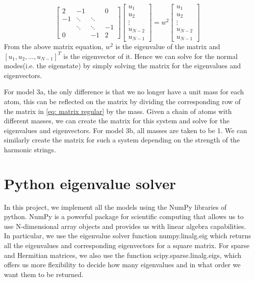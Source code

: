 \begin{equation} \label{eq: matrix regular}
\left[ \begin{matrix}
2 & -1 & & 0\\
-1 & \ddots & \ddots & \\
& \ddots & \ddots & -1 \\
0 & & -1 & 2 \end{matrix} \right]
\begin{bmatrix}
     u_{1}  \\
     u_{2}  \\
    \vdots  \\
    u_{N-2}\\
    u_{N-1}
    \end{bmatrix} = w^2\begin{bmatrix}
    u_{1}  \\
    u_{2}  \\
    \vdots  \\
    u_{N-2}\\
    u_{N-1}
    \end{bmatrix}
\end{equation}
From the above matrix equation, $w^2$ is the eigenvalue of the matrix and $[u_1,u_2,...,u_{N-1}]^T$ is the eigenvector of it. Hence we can solve for the normal modes(i.e. the eigenstate) by simply solving the matrix for the eigenvalues and eigenvectors. 

For model 3a, the only difference is that we no longer have a unit mass for each atom, this can be reflected on the matrix by dividing the corresponding row of the matrix in \ref{eq: matrix regular} by the mass. Given a chain of atoms with different masses, we can create the matrix for this system and solve for the eigenvalues and eigenvectors. 
For model 3b, all masses are taken to be 1. We can similarly create the matrix for such a system depending on the strength of the harmonic strings. 

\section{Python eigenvalue solver}
In this project, we implement all the models using the NumPy libraries of python. NumPy is a powerful package for scientific computing that allows us to use N-dimensional array objects and provides us with linear algebra capabilities. In particular, we use the eigenvalue solver function numpy.linalg.eig which returns all the eigenvalues and corresponding eigenvectors for a square matrix. For sparse and Hermitian matrices, we also use the function scipy.sparse.linalg.eigs, which offers us more flexibility to decide how many eigenvalues and in what order we want them to be returned. 

